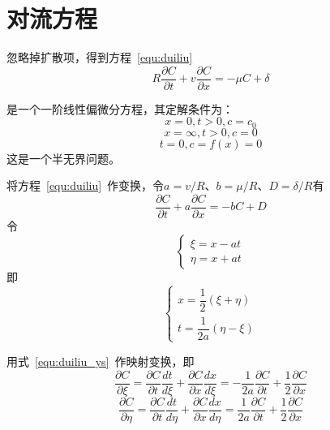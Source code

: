 \section{对流方程}
忽略掉扩散项，得到方程~\ref{equ:duiliu}
\begin{equation}\label{equ:duiliu}
R\dfrac{\partial C}{\partial t}+v\dfrac{\partial C}{\partial x}= -\mu C + \delta
\end{equation}\par
是一个一阶线性偏微分方程，其定解条件为：
\begin{equation}\label{equ:duiliu_bj}
x=0,t>0,c=c_0
\end{equation}
\begin{equation}
x=\infty,t>0,c=0
\end{equation}
\begin{equation}\label{equ:duiliu_init}
t=0,c=f(x)=0
\end{equation}
这是一个半无界问题。\par
将方程~\ref{equ:duiliu}~作变换，令$a=v/R$、$b=\mu/R$、$D=\delta/R$有
\begin{equation}\label{equ:duiliu_n}
\dfrac{\partial C}{\partial t}+a\dfrac{\partial C}{\partial x}= -b C + D
\end{equation}
令
\begin{equation}\label{equ:duiliu_ys}
\begin{cases}
\xi=x-at \\
\eta=x+at
\end{cases}
\end{equation}
即
\begin{equation}
\begin{cases}
x=\dfrac{1}{2}(\xi+\eta)\\[1.2em]
t=\dfrac{1}{2a}(\eta-\xi)
\end{cases}
\end{equation}\par
用式~\ref{equ:duiliu_ys}~作映射变换，即
\begin{equation}
\dfrac{\partial C}{\partial \xi}=\dfrac{\partial C}{\partial t}\dfrac{dt}{d\xi}+
								 \dfrac{\partial C}{\partial x}\dfrac{dx}{d\xi}
								=-\dfrac{1}{2a}\dfrac{\partial C}{\partial t}+\dfrac{1}{2}\dfrac{\partial C}{\partial x}						
\end{equation}
\begin{equation}
\dfrac{\partial C}{\partial \eta}=\dfrac{\partial C}{\partial t}\dfrac{dt}{d\eta}+
								 \dfrac{\partial C}{\partial x}\dfrac{dx}{d\eta}
								=\dfrac{1}{2a}\dfrac{\partial C}{\partial t}+
								\dfrac{1}{2}\dfrac{\partial C}{\partial x}		
\end{equation}\par
